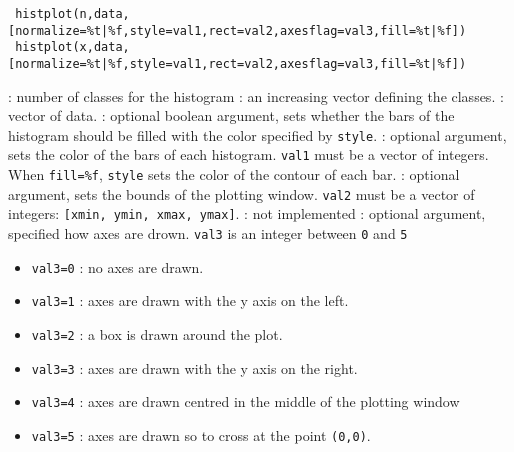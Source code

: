 
\begin{mandesc}
\end{mandesc}

\begin{calling_sequence}
\begin{verbatim}
 histplot(n,data,[normalize=%t|%f,style=val1,rect=val2,axesflag=val3,fill=%t|%f])
 histplot(x,data,[normalize=%t|%f,style=val1,rect=val2,axesflag=val3,fill=%t|%f])
\end{verbatim}
\end{calling_sequence}
\begin{parameters}
  \begin{varlist}
     : number of classes for the histogram
     : an increasing vector defining the classes.
     : vector of data.
     : optional boolean argument, sets whether the bars of the histogram
    should be filled with the color specified by \verb+style+.
     : optional  argument, sets the color of the bars of each
    histogram. \verb+val1+ must be a vector of integers.  When \verb+fill=%f+,
    \verb+style+ sets the color of the contour of each bar.
     : optional argument, sets the bounds of the plotting
    window. \verb+val2+ must be a vector of integers: \verb+[xmin, ymin, xmax, ymax]+.
     : not implemented
     : optional argument, specified how axes are
    drown. \verb+val3+ is an integer between \verb+0+ and \verb+5+
    \begin{itemize}
    \item \verb+val3=0+ : no axes are drawn.
    \item \verb+val3=1+ : axes are drawn with the y axis on the left.
    \item \verb+val3=2+ : a box is drawn around the plot.
    \item \verb+val3=3+ : axes are drawn with the y axis on the right.
    \item \verb+val3=4+ : axes are drawn centred in the middle of the plotting window
    \item \verb+val3=5+ : axes are drawn so to cross at the point \verb+(0,0)+.
    \end{itemize}

\end{varlist}
\end{parameters}

